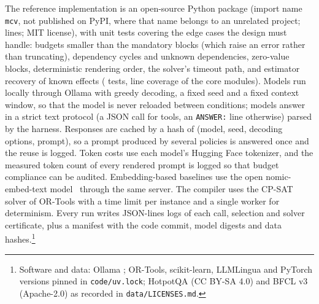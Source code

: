 The reference implementation is an open-source Python package (import name \texttt{mcv}, not published on PyPI, where
that name belongs to an unrelated project; \RLoc{} lines; MIT license), with unit tests
covering the edge cases the design must handle: budgets smaller than the mandatory blocks (which raise an error rather than
truncating), dependency cycles and unknown dependencies, zero-value blocks, deterministic rendering order, the solver's
timeout path, and estimator recovery of known effects (\RTests{} tests, \RCoverage{} line coverage of the core
modules). Models run locally through Ollama with greedy decoding, a fixed seed and a fixed context window, so that the
model is never reloaded between conditions; models answer in a strict text protocol (a JSON call for tools, an
\texttt{ANSWER:} line otherwise) parsed by the harness. Responses are cached by a hash of (model, seed, decoding options,
prompt), so a prompt produced by several policies is answered once and the reuse is logged. Token costs use each model's
Hugging Face tokenizer, and the measured token count of every rendered prompt is logged so that budget compliance can be
audited. Embedding-based baselines use the open nomic-embed-text model~\cite{nomicembed2024} through the same server.
The compiler uses the CP-SAT solver of OR-Tools with a time limit per instance and a single worker for determinism.
Every run writes JSON-lines logs of each call, selection and solver certificate, plus a manifest with the code commit,
model digests and data hashes.\footnote{Software and data: Ollama \ROllamaVersion; OR-Tools, scikit-learn, LLMLingua and PyTorch
versions pinned in \texttt{code/uv.lock}; HotpotQA (CC BY-SA 4.0) and BFCL v3 (Apache-2.0) as recorded in
\texttt{data/LICENSES.md}.}
